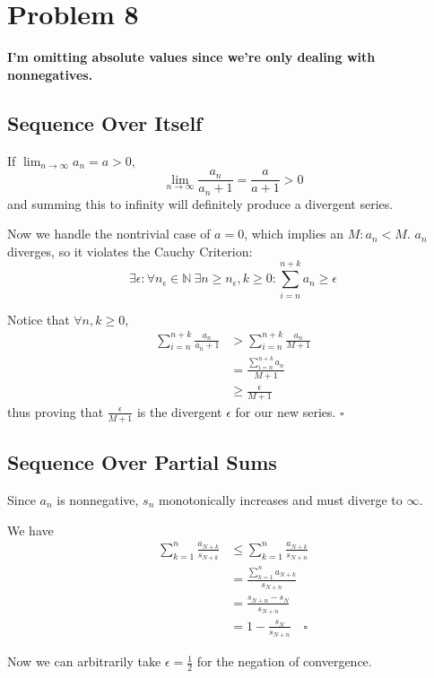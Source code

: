 \documentclass[12pt]{article}
\newcommand{\N}{\mathbb{N}}
\begin{document}
\section{Problem 8}

\textbf{I'm omitting absolute values since we're only dealing with nonnegatives.}

\subsection{Sequence Over Itself}

If $\lim_{n \to \infty} a_n = a > 0$,
\[\lim_{n \to \infty} \frac{a_n}{a_n+1}=\frac{a}{a+1} > 0\]
and summing this to infinity will definitely produce a divergent series.

Now we handle the nontrivial case of $a=0$, which implies an $M: a_n < M$.
$a_n$ diverges, so it violates the Cauchy Criterion:
\[\exists \epsilon: \forall n_\epsilon \in \N\ \exists n \ge n_\epsilon, k \ge 0: \sum_{i=n}^{n+k} a_n \ge \epsilon\]

Notice that $\forall n, k \ge 0$,
\begin{align*}
  \sum_{i=n}^{n+k} \frac{a_n}{a_n+1}
   & > \sum_{i=n}^{n+k} \frac{a_n}{M+1} \\
   & = \frac{\sum_{i=n}^{n+k} a_n}{M+1} \\
   & \ge \frac{\epsilon}{M+1}
\end{align*}
thus proving that $\frac{\epsilon}{M+1}$ is the divergent $\epsilon$ for our new series. $\square$

\subsection{Sequence Over Partial Sums}

Since $a_n$ is nonnegative, $s_n$ monotonically increases and must diverge to $\infty$.

We have
\begin{align*}
  \sum_{k=1}^{n} \frac{a_{N+k}}{s_{N+k}}
   & \le \sum_{k=1}^{n} \frac{a_{N+k}}{s_{N+n}} \\
   & = \frac{\sum_{k=1}^{n} a_{N+k}}{s_{N+n}}   \\
   & = \frac{s_{N+n} - s_N}{s_{N+n}}            \\
   & = 1-\frac{s_N}{s_{N+n}}\quad\square
\end{align*}

Now we can arbitrarily take $\epsilon=\frac{1}{2}$ for the negation of convergence.
\end{document}
